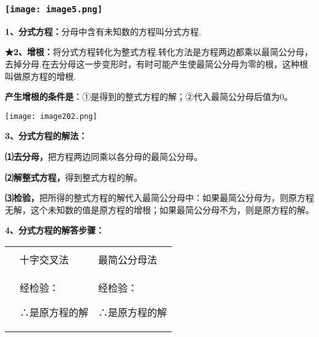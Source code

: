 \hypertarget{ux5b66ux79d1ux7f51www.zxxk.com--ux6559ux80b2ux8d44ux6e90ux95e8ux6237ux63d0ux4f9bux8bd5ux9898ux8bd5ux5377ux6559ux6848ux8bfeux4ef6ux6559ux5b66ux8bbaux6587ux7d20ux6750ux7b49ux5404ux7c7bux6559ux5b66ux8d44ux6e90ux5e93ux4e0bux8f7dux8fd8ux6709ux5927ux91cfux4e30ux5bccux7684ux6559ux5b66ux8d44ux8baf-36}{%
\subsubsection{\texorpdfstring{\protect\texttt{[image: image5.png]}}{学科网(www.zxxk.com)-\/-教育资源门户，提供试题试卷、教案、课件、教学论文、素材等各类教学资源库下载，还有大量丰富的教学资讯！}}\label{ux5b66ux79d1ux7f51www.zxxk.com--ux6559ux80b2ux8d44ux6e90ux95e8ux6237ux63d0ux4f9bux8bd5ux9898ux8bd5ux5377ux6559ux6848ux8bfeux4ef6ux6559ux5b66ux8bbaux6587ux7d20ux6750ux7b49ux5404ux7c7bux6559ux5b66ux8d44ux6e90ux5e93ux4e0bux8f7dux8fd8ux6709ux5927ux91cfux4e30ux5bccux7684ux6559ux5b66ux8d44ux8baf-36}}

\textbf{1、分式方程：}分母中含有未知数的方程叫分式方程.

\textbf{★2、增根：}将分式方程转化为整式方程.转化方法是方程两边都乘以最简公分母，去掉分母.在去分母这一步变形时，有时可能产生使最简公分母为零的根，这种根叫做原方程的增根.

\textbf{产生增根的条件是}：①是得到的整式方程的解；②代入最简公分母后值为0。

\texttt{[image: image202.png]}

\textbf{3、分式方程的解法：}

\textbf{⑴去分母，}把方程两边同乘以各分母的最简公分母。

\textbf{⑵解整式方程，}得到整式方程的解。

\textbf{⑶检验，}把所得的整式方程的解代入最简公分母中：如果最简公分母为，则原方程无解，这个未知数的值是原方程的增根；如果最简公分母不为，则是原方程的解。

\textbf{4、分式方程的解答步骤：}

\begin{longtable}[]{@{}lll@{}}
\toprule
\endhead
& &\tabularnewline
& 十字交叉法 & 最简公分母法\tabularnewline
\begin{minipage}[t]{0.30\columnwidth}\raggedright
\strut
\end{minipage} & \begin{minipage}[t]{0.30\columnwidth}\raggedright
经检验：

∴是原方程的解\strut
\end{minipage} & \begin{minipage}[t]{0.30\columnwidth}\raggedright
经检验：

∴是原方程的解\strut
\end{minipage}\tabularnewline
\bottomrule
\end{longtable}


